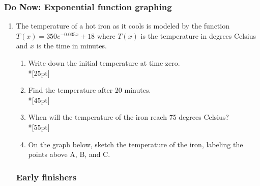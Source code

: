 \documentclass[12pt, twoside]{article}
\begin{document}
\subsubsection*{Do Now: Exponential function graphing}

\begin{enumerate}
\item The temperature of a hot iron as it cools is modeled by the function $T(x)=350e^{-0.035x}+18$ where $T(x)$ is the temperature in degrees Celsius and $x$ is the time in minutes.

\begin{enumerate}
    \item Write down the initial temperature at time zero.\\*[25pt]
    \item Find the temperature after 20 minutes.\\*[45pt]
    \item When will the temperature of the iron reach 75 degrees Celsius?\\*[55pt]
    \item On the graph below, sketch the temperature of the iron, labeling the points above A, B, and C.
\end{enumerate}

\begin{figure}[!htbp]
\begin{center}
\end{center}
\end{figure}

\newpage

\subsubsection*{Early finishers}


\end{enumerate}
\end{document}
